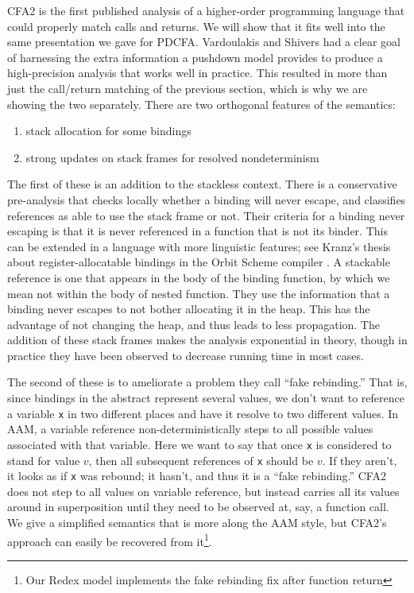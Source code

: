 \documentclass{llncs}
\begin{document}
CFA2 is the first published analysis of a higher-order programming
language that could properly match calls and returns. We will show
that it fits well into the same presentation we gave for
PDCFA. Vardoulakis and Shivers had a clear goal of harnessing the
extra information a pushdown model provides to produce a
high-precision analysis that works well in practice. This resulted in
more than just the call/return matching of the previous section, which
is why we are showing the two separately. There are two orthogonal
features of the semantics:
\begin{enumerate}
\item{stack allocation for some bindings}
\item{strong updates on stack frames for resolved nondeterminism}
\end{enumerate}
The first of these is an addition to the stackless context. There is a
conservative pre-analysis that checks locally whether a binding will
never escape, and classifies references as able to use the stack frame
or not. Their criteria for a binding never escaping is that it is
never referenced in a function that is not its binder. This can be
extended in a language with more linguistic features; see Kranz's
thesis about register-allocatable bindings in the Orbit Scheme
compiler \citep{ianjohnson:kranz:thesis:1988}. A stackable reference
is one that appears in the body of the binding function, by which we
mean not within the body of nested function. They use the information
that a binding never escapes to not bother allocating it in the
heap. This has the advantage of not changing the heap, and thus leads
to less propagation. The addition of these stack frames makes the
analysis exponential in theory, though in practice they have been
observed to decrease running time in most cases.

The second of these is to ameliorate a problem they call ``fake
rebinding.'' That is, since bindings in the abstract represent several
values, we don't want to reference a variable \texttt{x} in two
different places and have it resolve to two different values. In AAM,
a variable reference non-deterministically steps to all possible
values associated with that variable. Here we want to say that once
\texttt{x} is considered to stand for value $v$, then all subsequent
references of \texttt{x} should be $v$. If they aren't, it looks as if
\texttt{x} was rebound; it hasn't, and thus it is a ``fake
rebinding.'' CFA2 does not step to all values on variable reference,
but instead carries all its values around in superposition until they
need to be observed at, say, a function call. We give a simplified
semantics that is more along the AAM style, but CFA2's approach can
easily be recovered from it\footnote{Our Redex model implements the fake rebinding fix after function return}.
\end{document}
